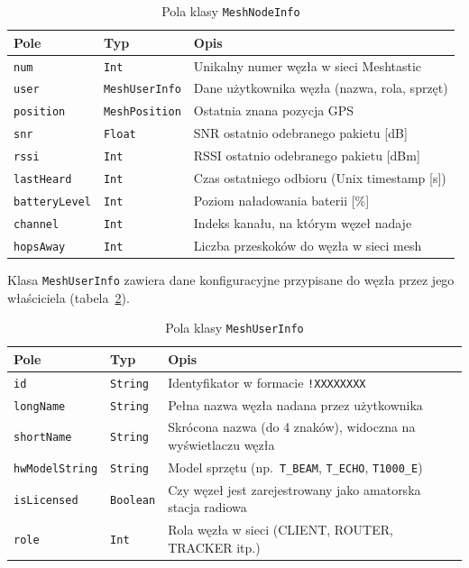 \begin{table}[!h]
    \caption{Pola klasy \texttt{MeshNodeInfo}}
    \label{tab:meshnodeinfo}
    \centering
    \begin{tabular}{|l|l|p{6.5cm}|}
        \hline
        \textbf{Pole} & \textbf{Typ} & \textbf{Opis} \\
        \hline
        \texttt{num}          & \texttt{Int}           & Unikalny numer węzła w sieci Meshtastic \\
        \texttt{user}         & \texttt{MeshUserInfo} & Dane użytkownika węzła (nazwa, rola, sprzęt) \\
        \texttt{position}     & \texttt{MeshPosition} & Ostatnia znana pozycja GPS \\
        \texttt{snr}          & \texttt{Float}         & SNR ostatnio odebranego pakietu [dB] \\
        \texttt{rssi}         & \texttt{Int}           & RSSI ostatnio odebranego pakietu [dBm] \\
        \texttt{lastHeard}    & \texttt{Int}           & Czas ostatniego odbioru (Unix timestamp [s]) \\
        \texttt{batteryLevel} & \texttt{Int}           & Poziom naładowania baterii [\%] \\
        \texttt{channel}      & \texttt{Int}           & Indeks kanału, na którym węzeł nadaje \\
        \texttt{hopsAway}     & \texttt{Int}           & Liczba przeskoków do węzła w sieci mesh \\
        \hline
    \end{tabular}
\end{table}

Klasa \texttt{MeshUserInfo} zawiera dane konfiguracyjne przypisane do węzła przez jego
właściciela (tabela~\ref{tab:meshuserinfo}).

\begin{table}[!h]
    \caption{Pola klasy \texttt{MeshUserInfo}}
    \label{tab:meshuserinfo}
    \centering
    \begin{tabular}{|l|l|p{6.5cm}|}
        \hline
        \textbf{Pole} & \textbf{Typ} & \textbf{Opis} \\
        \hline
        \texttt{id}            & \texttt{String}  & Identyfikator w formacie \texttt{!XXXXXXXX} \\
        \texttt{longName}      & \texttt{String}  & Pełna nazwa węzła nadana przez użytkownika \\
        \texttt{shortName}     & \texttt{String}  & Skrócona nazwa (do 4 znaków), widoczna na wyświetlaczu węzła \\
        \texttt{hwModelString} & \texttt{String} & Model sprzętu (np.\ \texttt{T\_BEAM}, \texttt{T\_ECHO}, \texttt{T1000\_E}) \\
        \texttt{isLicensed}    & \texttt{Boolean} & Czy węzeł jest zarejestrowany jako amatorska stacja radiowa \\
        \texttt{role}          & \texttt{Int}     & Rola węzła w sieci (CLIENT, ROUTER, TRACKER itp.) \\
        \hline
    \end{tabular}
\end{table}

